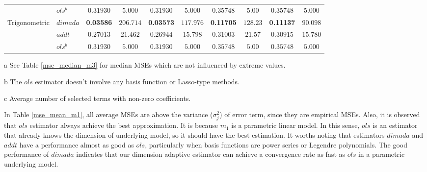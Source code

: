 \documentclass[12pt, a4paper]{article}
\theoremstyle{MAstyle} \newtheorem{assumption}{Assumption}[section]
\theoremstyle{MAstyle} \newtheorem{definition}{Definition}[section]
\theoremstyle{MAstyle} \newtheorem{theorem}{Theorem}[section]
\theoremstyle{MAstyle} \newtheorem{corollary}{Corollary}[section]
\begin{document}
\begin{table}[!htbp]
{\begin{threeparttable}
\begin{tabular}{llcccccccc}
                        & $ols^b$ & $0.31930$ & $5.000$ & $0.31930$ & $5.000$ & $0.35748$ & $5.00$ & $0.35748$ & $5.000$ \\
                        Trigonometric & $dimada$ & \textbf{0.03586} & $206.714$ & \textbf{0.03573} & $117.976$ & \textbf{0.11705} & $128.23$ & \textbf{0.11137} & $90.098$ \\
                        & $addt$ & $0.27013$ & $21.462$ & $0.26944$ & $15.798$ & $0.31003$ & $21.57$ & $0.30915$ & $15.780$ \\
                        & $ols^b$ & $0.31930$ & $5.000$ & $0.31930$ & $5.000$ & $0.35748$ & $5.00$ & $0.35748$ & $5.000$ \\
                        \hline 
                        \hline
                    \end{tabular}
                    \begin{tablenotes}
                        \footnotesize   %
                        \item[a] See Table \ref{mse_median_m3} for median MSEs which are not influenced by extreme values. 
                        \item [b] The $ols$ estimator doesn't involve any basis function or Lasso-type methods.
                        \item [c] Average number of selected terms with non-zero coefficients.
                    \end{tablenotes}
                    \end{threeparttable}
                    }
                \end{table} 

                \newpage
                In Table \ref{mse_mean_m1}, all average MSEs are above the variance ($\sigma_j^2$) of error term, since they are empirical MSEs. Also, it is observed that $ols$ estimator always achieve the best approximation. It is because $m_1$ is a parametric linear model. In this sense, $ols$ is an estimator that already knows the dimension of underlying model, so it should have the best estimation. It worths noting that estimators $dimada$ and $addt$ have a performance almost as good as $ols$, particularly when basis functions are power series or Legendre polynomials. The good performance of $dimada$ indicates that our dimension adaptive estimator can achieve a convergence rate as fast as $ols$ in a parametric underlying model. \\
\end{document}
